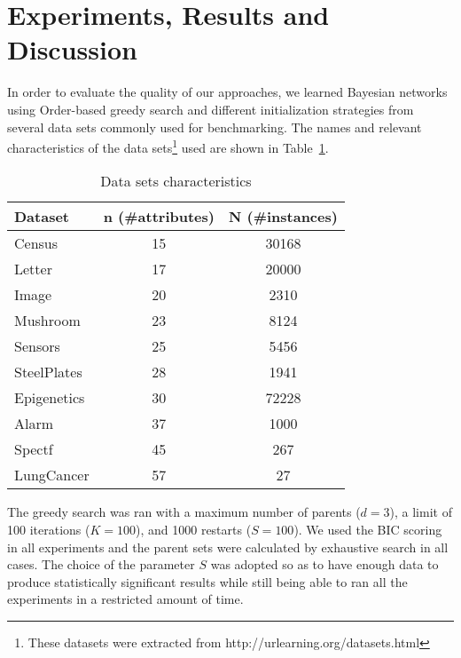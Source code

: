 \section{Experiments, Results and Discussion}
\label{sec:experiments}

In order to evaluate the quality of our approaches, we learned Bayesian networks using Order-based greedy search and different initialization strategies from several data sets commonly used for benchmarking. The names and relevant characteristics of the data sets\footnote{These datasets were extracted from http://urlearning.org/datasets.html} used are shown in Table~\ref{tab:datasets}.
	\begin{table}[ h ]
		\centering
		\begin{tabular}{ | l | c | c | }
			\hline
			Dataset & n (\#attributes) & N (\#instances) \\ \hline
			Census & 15 & 30168 \\ \hline
			Letter & 17 & 20000 \\ \hline
			Image & 20 & 2310 \\ \hline
			Mushroom & 23 & 8124 \\ \hline
			Sensors & 25 & 5456 \\ \hline
			SteelPlates & 28 & 1941 \\ \hline
			Epigenetics & 30 & 72228 \\ \hline
			Alarm & 37 & 1000 \\ \hline
			Spectf & 45 & 267 \\ \hline
			LungCancer & 57 & 27 \\ \hline
		\end{tabular}
		\caption{Data sets characteristics}
		\label{tab:datasets}
	\end{table}
The greedy search was ran with a maximum number of parents ($d=3$), a limit of 100 iterations ($K=100$), and 1000 restarts ($S=100$). We used the BIC scoring in all experiments and the parent sets were calculated by exhaustive search in all cases. The choice of the parameter $S$ was adopted so as to have enough data to produce statistically significant results while still being able to ran all the experiments in a restricted amount of time.

